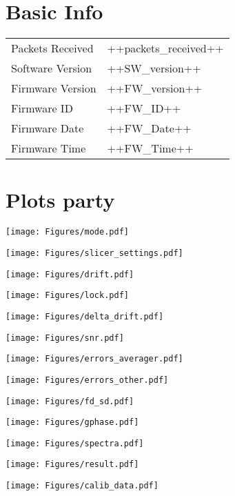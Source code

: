 
\section{Basic Info}

\begin{tabular}{p{5cm}p{5cm}}
    Packets Received              & ++packets_received++                                         \\
    Software Version              & ++SW_version++                                               \\
    Firmware Version              & ++FW_version++                                               \\
    Firmware ID                   & ++FW_ID++                                                    \\
    Firmware Date                 & ++FW_Date++                                                  \\
    Firmware Time                 & ++FW_Time++                                                  \\
\end{tabular}


\section{Plots party}

\texttt{[image: Figures/mode.pdf]}

\texttt{[image: Figures/slicer\_settings.pdf]}

\texttt{[image: Figures/drift.pdf]}

\texttt{[image: Figures/lock.pdf]}

\texttt{[image: Figures/delta\_drift.pdf]}

\texttt{[image: Figures/snr.pdf]}

\texttt{[image: Figures/errors\_averager.pdf]}

\texttt{[image: Figures/errors\_other.pdf]}

\texttt{[image: Figures/fd\_sd.pdf]}

\texttt{[image: Figures/gphase.pdf]}

\texttt{[image: Figures/spectra.pdf]}

\texttt{[image: Figures/result.pdf]}

\texttt{[image: Figures/calib\_data.pdf]}

